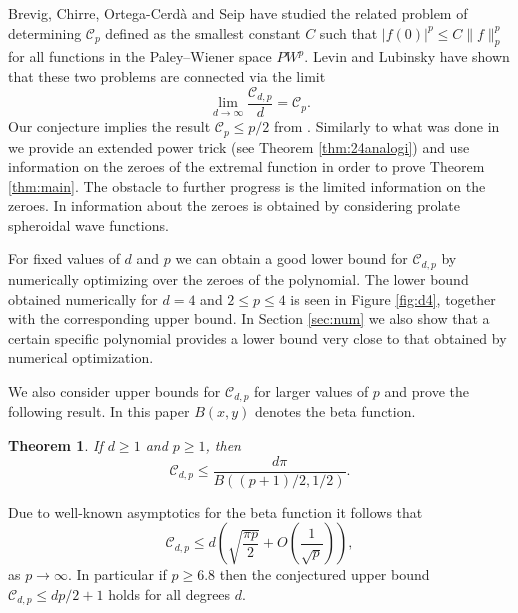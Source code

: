 \documentclass{amsart}
\theoremstyle{plain}
\newtheorem{theorem}{Theorem}
\theoremstyle{remark}
\begin{document}
	Brevig, Chirre, Ortega-Cerdà and Seip \cite{Brevig} have studied the related problem of determining $\mathscr{C}_p$ defined as the smallest constant $C$ such that $|f(0)|^p \leq C\|f\|_p^p$
	for all functions in the Paley--Wiener space $PW^p$. Levin and Lubinsky \cite{LevinLubinski} have shown that these two problems are connected via the limit 
	\[\lim_{d \to \infty} \frac{\mathscr{C}_{d,p}}{d}=\mathscr{C}_p.\]
	Our conjecture implies the result $\mathscr{C}_p \leq p/2$ from \cite{Brevig}. Similarly to what was done in \cite{Brevig}
	we provide an extended power trick (see Theorem \ref{thm:24analogi}) and use information on the zeroes of the extremal function in order to prove Theorem \ref{thm:main}. The obstacle to further progress is the limited information on the zeroes. In \cite{Brevig} information about the zeroes is obtained by considering prolate spheroidal wave functions.
	
	For fixed values of $d$ and $p$ we can obtain a good lower bound for $\mathscr{C}_{d,p}$ by numerically optimizing over the zeroes of the polynomial. The lower bound  obtained numerically for $d=4$ and $2 \leq p \leq 4$ is seen in Figure \ref{fig:d4}, together with the corresponding upper bound. In Section \ref{sec:num} we also show that a certain specific polynomial provides a lower bound very close to that obtained by numerical optimization. 
	
	We also consider upper bounds for $\mathscr{C}_{d,p}$ for larger values of $p$ and prove the following result. In this paper $B(x,y)$ denotes the beta function. 
	\begin{theorem}\label{thm:plarge}
		If $d \geq 1$ and $p \geq 1$, then 
		\[\mathscr{C}_{d,p} \leq \frac{d\pi}{B((p+1)/2,1/2)}.\]
	\end{theorem}	
	Due to well-known asymptotics for the beta function it follows that %
	\[\mathscr{C}_{d,p} \leq d\left( \sqrt{\frac{\pi p}{2}}+O\left(\frac{1}{\sqrt{p}}\right) \right),\]
	as $p \to \infty$. In particular if $p \geq 6.8$ then the conjectured upper bound  $\mathscr{C}_{d,p} \leq dp/2+1$ holds for all degrees $d$.
	
\end{document}
